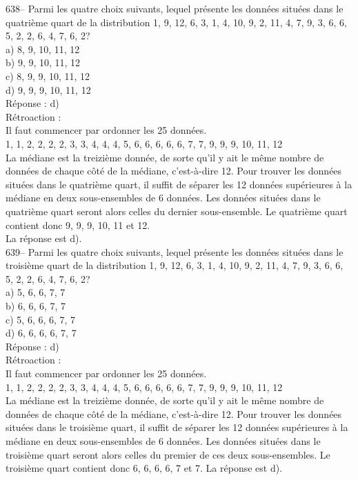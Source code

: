﻿\documentclass[letterpaper, 12pt]{article}
\begin{document}
638--  Parmi les quatre choix suivants, lequel pr\'esente les donn\'ees
situ\'ees dans le quatri\`eme quart de la distribution 1, 9, 12, 6, 3, 1, 4,
10, 9, 2, 11, 4, 7, 9, 3, 6, 6, 5, 2, 2, 6, 4, 7, 6, 2?\\
a) 8, 9, 10, 11, 12\\
b) 9, 9, 10, 11, 12\\
c) 8, 9, 9, 10, 11, 12\\
d) 9, 9, 9, 10, 11, 12\\

R\'eponse : d)\\

R\'etroaction : \\
Il faut commencer par ordonner les 25 donn\'ees.\\
1, 1, 2, 2, 2, 2, 3, 3, 4, 4, 4, 5, 6, 6, 6, 6, 6, 7, 7, 9, 9, 9, 10, 11,
12\\
La m\'ediane est la treizi\`eme donn\'ee, de sorte qu'il y ait le m\^eme
nombre de donn\'ees de chaque c\^ot\'e de la m\'ediane, c'est-\`a-dire 12.
Pour trouver les donn\'ees situ\'ees dans le quatri\`eme quart, il suffit de
s\'eparer les 12 donn\'ees sup\'erieures \`a la m\'ediane en deux
sous-ensembles de 6 donn\'ees.  Les donn\'ees situ\'ees dans le quatri\`eme
quart seront alors celles du dernier sous-ensemble. Le quatri\`eme quart
contient donc 9, 9, 9, 10, 11 et 12.\\
La r\'eponse est d). \\

639-- Parmi les quatre choix suivants, lequel pr\'esente les donn\'ees
situ\'ees dans le troisi\`eme quart de la distribution 1, 9, 12, 6, 3, 1, 4,
10, 9, 2, 11, 4, 7, 9, 3, 6, 6, 5, 2, 2, 6, 4, 7, 6, 2?\\
a) 5, 6, 6, 7, 7\\
b) 6, 6, 6, 7, 7\\
c) 5, 6, 6, 6, 7, 7\\
d) 6, 6, 6, 6, 7, 7\\

R\'eponse : d)\\

R\'etroaction : \\
Il faut commencer par ordonner les 25 donn\'ees.\\
1, 1, 2, 2, 2, 2, 3, 3, 4, 4, 4, 5, 6, 6, 6, 6, 6, 7, 7, 9, 9, 9, 10, 11,
12\\
La m\'ediane est la treizi\`eme donn\'ee, de sorte qu'il y ait le m\^eme
nombre de donn\'ees de chaque c\^ot\'e de la m\'ediane, c'est-\`a-dire 12.
Pour trouver les donn\'ees situ\'ees dans le troisi\`eme quart, il suffit de
s\'eparer les 12 donn\'ees sup\'erieures \`a la m\'ediane en deux
sous-ensembles de 6 donn\'ees.  Les donn\'ees situ\'ees dans le troisi\`eme
quart seront alors celles du premier de ces deux sous-ensembles.  Le
troisi\`eme quart contient donc 6, 6, 6, 6, 7 et 7.  La r\'eponse est d). \\
\end{document}
